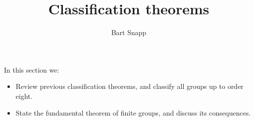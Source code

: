 \documentclass{ximera}
\author{Bart Snapp}
\title{Classification theorems}
\begin{document}
\begin{abstract}
\end{abstract}
\maketitle
In this section we:

\begin{itemize}
\item Review previous classification theorems, and classify all groups
  up to order eight.
\item State the fundamental theorem of finite groups, and discuss its
  consequences.
\end{itemize}
\end{document}
